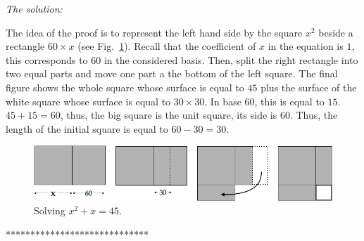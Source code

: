 {\noindent \textit{The solution:}

The idea of the proof is to represent the left hand side by the square $x^2$ beside a rectangle $60 \times x$
(see Fig.~\ref{fig:equationBabillon}).
Recall that the coefficient of $x$ in the equation is $1$, this corresponds to $60$ in the considered basis. 
Then, split the right rectangle into two equal parts and move one part a the bottom of the left square.
The final figure shows the whole square whose surface is equal to $45$ plus the surface of the white square
whose surface is equal to $30 \times 30$.
In base $60$, this is equal to $15$. 
$45+15 = 60$, thus, the big square is the unit square, its side is $60$.
Thus, the length of the initial square is equal to $60-30=30$.
\begin{figure}[htb]
\begin{center}
       \includegraphics[scale=0.4]{FiguresArithmetic/tabletteMesopotamie}
\caption{Solving $x^2 + x = 45$.}
\label{fig:equationBabillon}
\end{center}
\end{figure}
*****************************}





